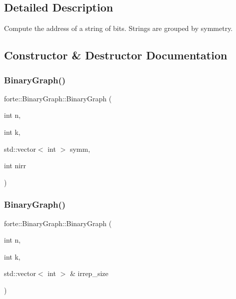 \subsection{Detailed Description}
Compute the address of a string of bits. Strings are grouped by symmetry. 

\subsection{Constructor \& Destructor Documentation}
\mbox{\label{classforte_1_1_binary_graph_a7db10825a6ba7e9c674ea2572e18f721}} 
\subsubsection{\texorpdfstring{Binary\+Graph()}{BinaryGraph()}\hspace{0.1cm}{\footnotesize\ttfamily [1/2]}}
{\footnotesize\ttfamily forte\+::\+Binary\+Graph\+::\+Binary\+Graph (\begin{DoxyParamCaption}\item[{int}]{n,  }\item[{int}]{k,  }\item[{std\+::vector$<$ int $>$}]{symm,  }\item[{int}]{nirr }\end{DoxyParamCaption})\hspace{0.3cm}{\ttfamily [inline]}}

\mbox{\label{classforte_1_1_binary_graph_a2e5b37be3498a0510d728a06d13d3dbb}} 
\subsubsection{\texorpdfstring{Binary\+Graph()}{BinaryGraph()}\hspace{0.1cm}{\footnotesize\ttfamily [2/2]}}
{\footnotesize\ttfamily forte\+::\+Binary\+Graph\+::\+Binary\+Graph (\begin{DoxyParamCaption}\item[{int}]{n,  }\item[{int}]{k,  }\item[{std\+::vector$<$ int $>$ \&}]{irrep\+\_\+size }\end{DoxyParamCaption})\hspace{0.3cm}{\ttfamily [inline]}}

